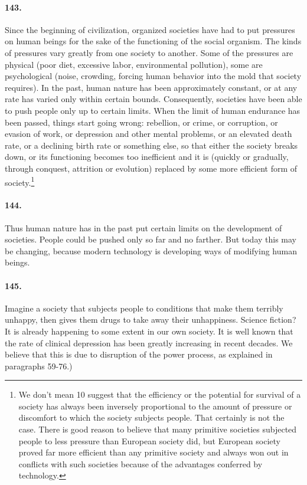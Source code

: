 \documentclass[12pt]{book}
\begin{document}
\paragraph{143.} Since the beginning of civilization, organized societies have had to put pressures on human beings for the sake of the functioning of the social organism. The kinds of pressures vary greatly from one society to another.  Some of the pressures are physical (poor diet, excessive labor, environmental pollution), some are psychological (noise, crowding, forcing human behavior into the mold that society requires). In the past, human nature has been approximately constant, or at any rate has varied only within certain bounds. Consequently, societies have been able to push people only up to certain limits. When the limit of human endurance has been passed, things start going wrong: rebellion, or crime, or corruption, or evasion of work, or depression and other mental problems, or an elevated death rate, or a declining birth rate or something else, so that either the society breaks down, or its functioning becomes too inefficient and it is (quickly or gradually, through conquest, attrition or evolution) replaced by some more efficient form of society.\footnote{We don't mean 10 suggest that the efficiency or the potential for survival of a society has always been inversely proportional to the amount of pressure or discomfort to which the society subjects people. That certainly is not the case. There is good reason to believe that many primitive societies subjected people to less pressure than European society did, but European society proved far more efficient than any primitive society and always won out in conflicts with such societies because of the advantages conferred by technology.}


\paragraph{144.} Thus human nature has in the past put certain limits on the development of societies. People could be pushed only so far and no farther.  But today this may be changing, because modern technology is developing ways of modifying human beings.


\paragraph{145.}  Imagine a society that subjects people to conditions that make them terribly unhappy, then gives them drugs to take away their unhappiness.  Science fiction? It is already happening to some extent in our own society. It is well known that the rate of clinical depression has been greatly increasing in recent decades. We believe that this is due to disruption of the power process, as explained in paragraphs 59-76.)
\end{document}
